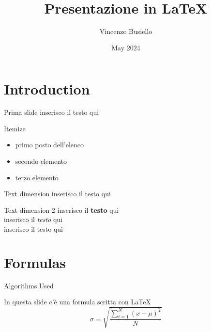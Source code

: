 \documentclass{beamer} %
\title{Presentazione in LaTeX}
\author{Vincenzo Busiello}
\date{May 2024}
\begin{document}
\maketitle

\section{Introduction}

\begin{frame}{Prima slide}
    inserisco il testo qui
\end{frame}

\begin{frame}{Itemize}
    \begin{itemize}
        \item primo posto dell'elenco
        \item secondo elemento
        \item terzo elemento
    \end{itemize}
\end{frame}


\begin{frame}{Text dimension}
    \scriptsize inserisco il testo qui \\
\end{frame}

\begin{frame}{Text dimension 2}
    inserisco il \textbf{testo} qui \\
    \bigskip
    inserisco il \textit{testo} qui \\
    \smallskip
    inserisco il testo qui
\end{frame}

\section{Formulas}
\begin{frame}{Algorithms Used}

In questa slide c'è una formula scritta con LaTeX
\bigskip
    \begin{equation}
        \sigma =\sqrt{\frac{\displaystyle\sum_{i=1}^{N}{(x - \mu)^2}}{N}}
    \end{equation}
\end{frame}
\end{document}
